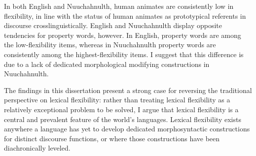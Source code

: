 In both English and Nuuchahnulth, human animates are consistently low in flexibility, in line with the status of human animates as prototypical referents in discourse crosslinguistically. English and Nuuchahnulth display opposite tendencies for property words, however. In English, property words are among the low-flexibility items, whereas in Nuuchahnulth property words are consistently among the highest-flexibility items. I suggest that this difference is due to a lack of dedicated morphological modifying constructions in Nuuchahnulth.

The findings in this dissertation present a strong case for reversing the traditional perspective on lexical flexibility: rather than treating lexical flexibility as a relatively exceptional problem to be solved, I argue that lexical flexibility is a central and prevalent feature of the world's languages. Lexical flexibility exists anywhere a language has yet to develop dedicated morphosyntactic constructions for distinct discourse functions, or where those constructions have been diachronically leveled.
